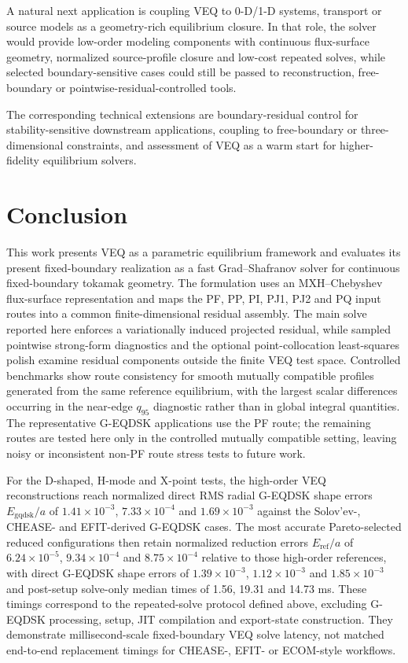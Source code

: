 \documentclass[final, 3p, times]{elsarticle}
\begin{document}
A natural next application is coupling VEQ to 0-D/1-D systems, transport or source models as a geometry-rich equilibrium closure. In that role, the solver would provide low-order modeling components with continuous flux-surface geometry, normalized source-profile closure and low-cost repeated solves, while selected boundary-sensitive cases could still be passed to reconstruction, free-boundary or pointwise-residual-controlled tools.

The corresponding technical extensions are boundary-residual control for stability-sensitive downstream applications, coupling to free-boundary or three-dimensional constraints, and assessment of VEQ as a warm start for higher-fidelity equilibrium solvers.

\section{Conclusion}
\label{sec:conclusion}

This work presents VEQ as a parametric equilibrium framework and evaluates its present fixed-boundary realization as a fast Grad--Shafranov solver for continuous fixed-boundary tokamak geometry. The formulation uses an MXH--Chebyshev flux-surface representation and maps the PF, PP, PI, PJ1, PJ2 and PQ input routes into a common finite-dimensional residual assembly. The main solve reported here enforces a variationally induced projected residual, while sampled pointwise strong-form diagnostics and the optional point-collocation least-squares polish examine residual components outside the finite VEQ test space. Controlled benchmarks show route consistency for smooth mutually compatible profiles generated from the same reference equilibrium, with the largest scalar differences occurring in the near-edge $q_{95}$ diagnostic rather than in global integral quantities. The representative G-EQDSK applications use the PF route; the remaining routes are tested here only in the controlled mutually compatible setting, leaving noisy or inconsistent non-PF route stress tests to future work.

For the D-shaped, H-mode and X-point tests, the high-order VEQ reconstructions reach normalized direct RMS radial G-EQDSK shape errors $E_{\mathrm{gqdsk}}/a$ of $1.41\times 10^{-3}$, $7.33\times 10^{-4}$ and $1.69\times 10^{-3}$ against the Solov'ev-, CHEASE- and EFIT-derived G-EQDSK cases. The most accurate Pareto-selected reduced configurations then retain normalized reduction errors $E_{\mathrm{ref}}/a$ of $6.24\times 10^{-5}$, $9.34\times 10^{-4}$ and $8.75\times 10^{-4}$ relative to those high-order references, with direct G-EQDSK shape errors of $1.39\times 10^{-3}$, $1.12\times 10^{-3}$ and $1.85\times 10^{-3}$ and post-setup solve-only median times of 1.56, 19.31 and 14.73 ms. These timings correspond to the repeated-solve protocol defined above, excluding G-EQDSK processing, setup, JIT compilation and export-state construction. They demonstrate millisecond-scale fixed-boundary VEQ solve latency, not matched end-to-end replacement timings for CHEASE-, EFIT- or ECOM-style workflows.
\end{document}
